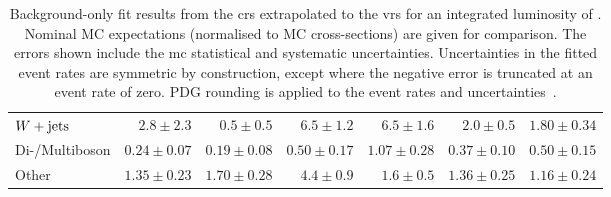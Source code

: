 \begin{table}
\begin{center}
{\begin{tabular}{lrrrrrr}
        $W+\mathrm{jets}$        & $2.8 \pm 2.3$          & $0.5 \pm 0.5$          & $6.5 \pm 1.2$    & $6.5 \pm 1.6$          & $2.0 \pm 0.5$          & $1.80 \pm 0.34$              \\
        Di-/Multiboson       & $0.24 \pm 0.07$          & $0.19 \pm 0.08$          & $0.50 \pm 0.17$     & $1.07 \pm 0.28$          & $0.37 \pm 0.10$          & $0.50 \pm 0.15$              \\
        Other       & $1.35 \pm 0.23$          & $1.70 \pm 0.28$          & $4.4 \pm 0.9$    & $1.6 \pm 0.5$          & $1.36 \pm 0.25$          & $1.16 \pm 0.24$              \\
\bottomrule
\end{tabular}
}
\end{center}
\caption{ Background-only fit results from the \glspl{cr} extrapolated to the \glspl{vr} for an integrated luminosity of \onethirtynineifb. Nominal MC expectations (normalised to MC cross-sections) are given for comparison. The errors shown include the \gls{mc} statistical and systematic uncertainties. Uncertainties in the fitted event rates are symmetric by construction, except where the negative error is truncated at an event rate of zero. PDG rounding is applied to the event rates and uncertainties~\cite{pdg2020}.}
\label{tab:results_bkg_only_VR}
\end{table}
%